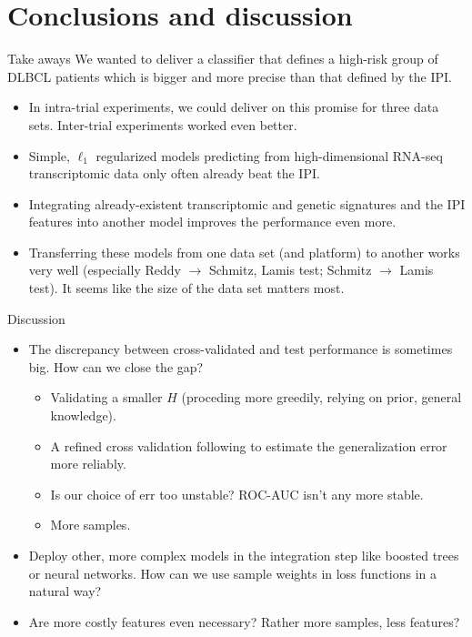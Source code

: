 \documentclass[10pt, aspectratio=169]{beamer}
\begin{document}
\section{Conclusions and discussion}
\begin{frame}{Take aways}
  We wanted to deliver a classifier that defines a high-risk group of DLBCL 
  patients which is bigger and more precise than that defined by the IPI.
  \begin{itemize}
    \item In intra-trial experiments, we could deliver on this promise for three 
      data sets. Inter-trial experiments worked even better.
    \pause
    \item Simple, $\ell_1$ regularized models predicting from high-dimensional 
      RNA-seq transcriptomic data only often already beat the IPI.
    \pause
    \item Integrating already-existent transcriptomic and genetic signatures 
      and the IPI features into another model improves the performance even more.
    \pause
    \item Transferring these models from one data set (and platform) to another
      works very well (especially Reddy $\to$ Schmitz, Lamis test; Schmitz $\to$ 
      Lamis test). It seems like the size of the data set matters most.
  \end{itemize}
\end{frame}

\begin{frame}{Discussion}
  \begin{itemize}
    \item The discrepancy between cross-validated and test performance is 
      sometimes big. How can we close the gap? \pause
      \begin{itemize}
        \item Validating a smaller $H$ (proceding more greedily, relying on 
          prior, general knowledge).
        \item A refined cross validation following \citep{nested-cv-hastie} to 
          estimate the generalization error more reliably.
        \item Is our choice of $\text{err}$ too unstable? ROC-AUC isn't any 
          more stable.
        \item More samples.
      \end{itemize}
    \pause
    \item Deploy other, more complex models in the integration step like boosted 
      trees or neural networks. How can we use sample weights in loss functions 
      in a natural way?
    \pause
    \item Are more costly features even necessary? Rather more samples, less 
      features?
  \end{itemize}
\end{frame}
\end{document}
